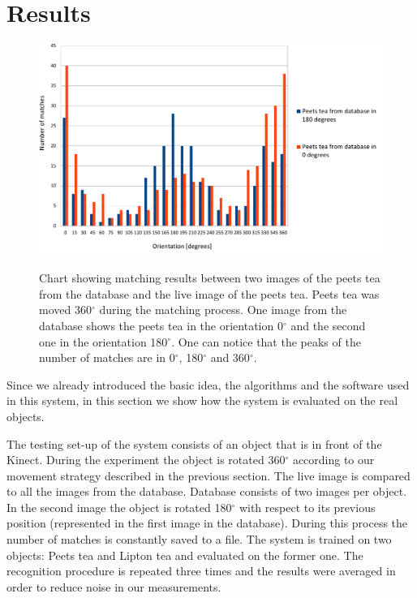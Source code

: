 \section{Results}

\begin{figure}

\includegraphics[width=1.3\columnwidth]{figures/print2.pdf}\\


\caption{Chart showing matching results between two images of the peets tea from the database and the live image of the peets tea. Peets tea was moved 360$^\circ$ during the matching process. One image from the database shows the peets tea in the orientation 0$^\circ$ and the second one in the orientation 180$^\circ$. One can notice that the peaks of the number of matches are in 0$^\circ$, 180$^\circ$ and 360$^\circ$.}
\label{fig:recognition-results}
\end{figure}
Since we already introduced the basic idea, the algorithms and the software used in this system, in this section we show how the system is evaluated on the real objects.

The testing set-up of the system consists of an object that is in front of the Kinect. During the experiment the object is rotated 360$^\circ$ according to our movement strategy described in the previous section. The live image is compared to all the images from the database. Database consists of two images per object. In the second image the object is rotated 180$^\circ$ with respect to its previous position (represented in the first image in the database). During this process the number of matches is constantly saved to a file. The system is trained on two objects: Peets tea and Lipton tea and evaluated on the former one. The recognition procedure is repeated three times and the results were averaged in order to reduce noise in our measurements. 

